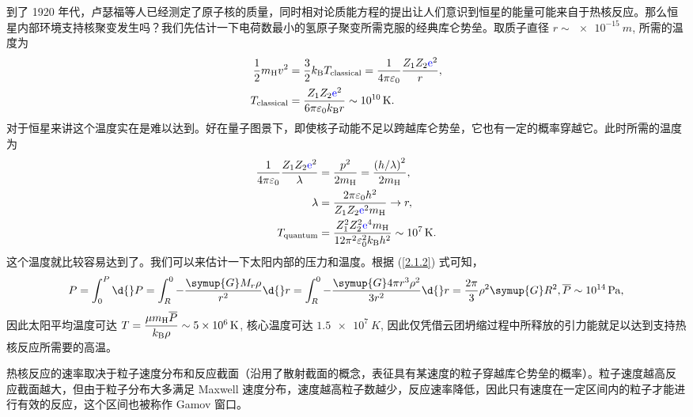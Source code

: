 \documentclass[../天体物理基础.tex]{subfiles}
\begin{document}
到了 1920 年代，卢瑟福等人已经测定了原子核的质量，同时相对论质能方程的提出让人们意识到恒星的能量可能来自于热核反应。那么恒星内部环境支持核聚变发生吗？我们先估计一下电荷数最小的氢原子聚变所需克服的经典库仑势垒。取质子直径 $r\sim\qty{e-15}{m}$, 所需的温度为
\begin{align}
\frac{1}{2}m_{\ce{H}}v^{2}&=\frac{3}{2}k_{\mathrm{B}}T_{\mathrm{classical}}=\frac{1}{4\pi\varepsilon_{0}}\frac{Z_{1}Z_{2}{\color{blue}{\ce{e}}}^{2}}{r},\\
T_{\mathrm{classical}}&=\frac{Z_{1}Z_{2}{\color{blue}{\ce{e}}}^{2}}{6\pi\varepsilon_{0}k_{\mathrm{B}}r}\sim\qty{e10}{K}.
\end{align}
对于恒星来讲这个温度实在是难以达到。好在量子图景下，即使核子动能不足以跨越库仑势垒，它也有一定的概率穿越它。此时所需的温度为
\begin{align}
\frac{1}{4\pi\varepsilon_{0}}\frac{Z_{1}Z_{2}{\color{blue}{\ce{e}}}^{2}}{\lambda}&=\frac{p^{2}}{2m_{\ce{H}}}=\frac{\mleft(h/\lambda\mright)^{2}}{2m_{\ce{H}}},\\
\lambda&=\frac{2\pi\varepsilon_{0}h^{2}}{Z_{1}Z_{2}{\color{blue}{\ce{e}}}^{2}m_{\ce{H}}}\to r,\\
T_{\mathrm{quantum}}&=\frac{Z_{1}^{2}Z_{2}^{2}{\color{blue}{\ce{e}}}^{4}m_{\ce{H}}}{12\pi^{2}\varepsilon_{0}^{2}k_{\mathrm{B}}h^{2}}\sim\qty{e7}{K}.
\end{align}
这个温度就比较容易达到了。我们可以来估计一下太阳内部的压力和温度。根据 (\ref{2.1.2}) 式可知，
\begin{equation}
P=\int_{0}^{P}\d{}P=\int_{R}^{0}-\frac{\symup{G}M_{r}\rho}{r^{2}}\d{}r=\int_{R}^{0}-\frac{\symup{G}4\pi{}r^{3}\rho^{2}}{3r^{2}}\d{}r=\frac{2\pi{}}{3}\rho^{2}\symup{G}R^{2},\overline{P}\sim\qty{e14}{Pa},
\end{equation}
因此太阳平均温度可达 $T=\dfrac{\mu m_{\ce{H}}\overline{P}}{k_{\mathrm{B}}\rho}\sim\qty{5e6}{K}$, 核心温度可达 $\qty{1.5e7}{K}$, 因此仅凭借云团坍缩过程中所释放的引力能就足以达到支持热核反应所需要的高温。

热核反应的速率取决于粒子速度分布和反应截面（沿用了散射截面的概念，表征具有某速度的粒子穿越库仑势垒的概率）。粒子速度越高反应截面越大，但由于粒子分布大多满足 Maxwell 速度分布，速度越高粒子数越少，反应速率降低，因此只有速度在一定区间内的粒子才能进行有效的反应，这个区间也被称作 Gamov 窗口。
\end{document}
